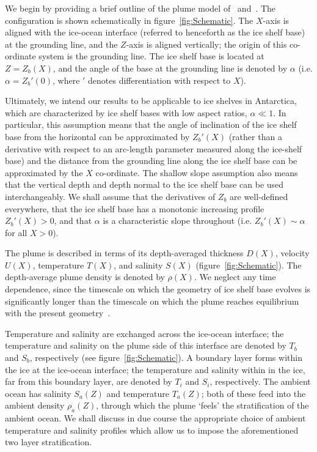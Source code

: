 \documentclass[openacc]{rsproca_new}%
\begin{document}
We begin by providing a brief outline of the plume model of~\citet{Jenkins1991JGeophysResOceans} and~\citet{Jenkins2011JPhysOcean}. The configuration is shown schematically in figure~\ref{fig:Schematic}. The $X$-axis is aligned with the ice-ocean interface (referred to henceforth as the ice shelf base) at the grounding line, and the $Z$-axis is aligned vertically; the origin of this co-ordinate system is the grounding line. The ice shelf base is located at $Z = Z_b(X)$, and the angle of the base at the grounding line is denoted by $\alpha$ (i.e. $\alpha = Z_b'(0)$, where $'$ denotes differentiation with respect to $X$).

Ultimately, we intend our results to  be applicable to ice shelves in Antarctica, which are characterized by ice shelf bases with low aspect ratios, $\alpha \ll 1$. In particular, this assumption means that the angle of inclination of the ice shelf base from the horizontal can be approximated by $Z_b'(X)$ (rather than a derivative with respect to an arc-length parameter measured along the ice-shelf base) and the distance from the grounding line along the ice shelf base can be approximated by the $X$ co-ordinate. The shallow slope assumption also means that the vertical depth and depth normal to the ice shelf base can be used interchangeably. We shall assume that the derivatives of $Z_b$ are well-defined everywhere, that the ice shelf base has a monotonic increasing profile $Z_b'(X) >0$, and that $\alpha$ is a characteristic slope throughout (i.e. $Z_b'(X)\sim \alpha$ for all $X >0$). 

The plume is described in terms of its depth-averaged thickness $D(X)$, velocity $U(X)$, temperature $T(X)$, and salinity $S(X)$ (figure~\ref{fig:Schematic}). The depth-average plume density is denoted by $\rho(X)$. We neglect any time dependence, since the timescale on which the geometry of ice shelf base evolves is significantly longer than the timescale on which the plume reaches equilibrium with the present geometry~\citep{Hewitt2020AnnRevFlu}.  

Temperature and salinity are exchanged across the ice-ocean interface; the temperature and salinity on the plume side of this interface are denoted by $T_b$ and $S_b$, respectively (see figure~\ref{fig:Schematic}). A boundary layer forms within the ice at the ice-ocean interface; the temperature and salinity within in the ice, far from this boundary layer, are denoted by $T_i$ and $S_i$, respectively. The ambient ocean has salinity $S_a(Z)$ and temperature $T_a(Z)$; both of these feed into the ambient density $\rho_a(Z)$, through which the plume `feels' the stratification of the ambient ocean.  We shall discuss in due course the appropriate choice of ambient temperature and salinity profiles which allow us to impose the aforementioned two layer stratification. 
\end{document}
